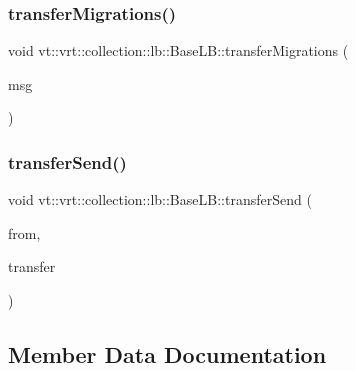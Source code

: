 \subsubsection{\texorpdfstring{transfer\+Migrations()}{transferMigrations()}}
{\footnotesize\ttfamily void vt\+::vrt\+::collection\+::lb\+::\+Base\+L\+B\+::transfer\+Migrations (\begin{DoxyParamCaption}\item[{\hyperlink{structvt_1_1vrt_1_1collection_1_1lb_1_1_transfer_msg}{Transfer\+Msg}$<$ \hyperlink{structvt_1_1vrt_1_1collection_1_1lb_1_1_base_l_b_a329e8179ec41a1bd4924c79fe23a79af}{Transfer\+Vec\+Type} $>$ $\ast$}]{msg }\end{DoxyParamCaption})}

\mbox{\label{structvt_1_1vrt_1_1collection_1_1lb_1_1_base_l_b_af8d95bc056659de7121bca99ce2d9d73}} 
\subsubsection{\texorpdfstring{transfer\+Send()}{transferSend()}}
{\footnotesize\ttfamily void vt\+::vrt\+::collection\+::lb\+::\+Base\+L\+B\+::transfer\+Send (\begin{DoxyParamCaption}\item[{\hyperlink{namespacevt_a866da9d0efc19c0a1ce79e9e492f47e2}{Node\+Type}}]{from,  }\item[{\hyperlink{structvt_1_1vrt_1_1collection_1_1lb_1_1_base_l_b_a329e8179ec41a1bd4924c79fe23a79af}{Transfer\+Vec\+Type} const \&}]{transfer }\end{DoxyParamCaption})}



\subsection{Member Data Documentation}
\mbox{\label{structvt_1_1vrt_1_1collection_1_1lb_1_1_base_l_b_aae83b83b87e2dea3d44861bd3fb1fde8}} 
